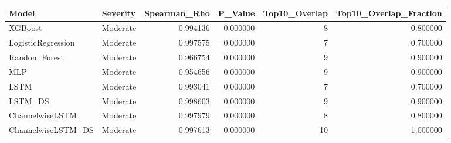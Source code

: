 \begin{tabular}{llrrrr}
\toprule
Model & Severity & Spearman\_Rho & P\_Value & Top10\_Overlap & Top10\_Overlap\_Fraction \\
\midrule
XGBoost & Moderate & 0.994136 & 0.000000 & 8 & 0.800000 \\
LogisticRegression & Moderate & 0.997575 & 0.000000 & 7 & 0.700000 \\
Random Forest & Moderate & 0.966754 & 0.000000 & 9 & 0.900000 \\
MLP & Moderate & 0.954656 & 0.000000 & 9 & 0.900000 \\
LSTM & Moderate & 0.993041 & 0.000000 & 7 & 0.700000 \\
LSTM\_DS & Moderate & 0.998603 & 0.000000 & 9 & 0.900000 \\
ChannelwiseLSTM & Moderate & 0.997979 & 0.000000 & 8 & 0.800000 \\
ChannelwiseLSTM\_DS & Moderate & 0.997613 & 0.000000 & 10 & 1.000000 \\
\bottomrule
\end{tabular}
